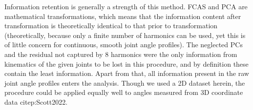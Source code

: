 \documentclass[10pt,a4paper]{article}
\begin{document}
\bigskip
Information retention is generally a strength of this method.
FCAS and PCA are mathematical transformations, which means that the information content after transformation is theoretically identical to that prior to transformation (theoretically, because only a finite number of harmonics can be used, yet this is of little concern for continuous, smooth joint angle profiles).
The neglected PCs and the residual not captured by 8 harmonics were the only information from kinematics of the given joints to be lost in this procedure, and by definition these contain the least information.
Apart from that, all information present in the raw joint angle profiles enters the analysis.
Though we used a 2D dataset herein, the procedure could be applied equally well to angles measured from 3D coordinate data citep:Scott2022.
\end{document}
